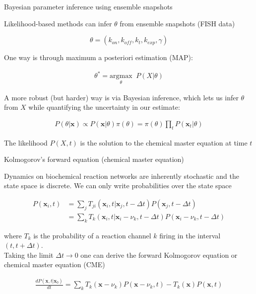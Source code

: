 \documentclass[aspectratio=1610]{beamer}					%
\begin{document}
\begin{frame}{Bayesian parameter inference using ensemble snapshots}
\vspace{0.1in}

Likelihood-based methods can infer $\theta$ from ensemble snapshots (FISH data)

\begin{equation*}
\theta = \left( k_{on},k_{off},k_{t},k_{exp},\gamma\right)
\end{equation*}

One way is through maximum a posteriori estimation (MAP):

\begin{align*}
\theta^{*} = \underset{\theta}{\mathrm{argmax}} \;\;P(X|\theta)
\end{align*}

A more robust (but harder) way is via Bayesian inference, which lets us infer $\theta$ from $X$ while quantifying the uncertainty in our estimate:

\begin{align*}
P(\theta|\mathbf{x}) \propto P(\mathbf{x}|\theta)\pi(\theta) = \pi(\theta)\prod_{t} P(\mathbf{x}_{t}|\theta)
\end{align*}

The likelihood $P(X,t)$ is the solution to the chemical master equation at time $t$

\end{frame}

\begin{frame}{Kolmogorov's forward equation (chemical master equation)}

Dynamics on biochemical reaction networks are inherently stochastic and the state space is discrete. We can only write probabilities over the state space

\vspace{0.1in}

\begin{align*}
P(\mathbf{x}_{i},t) &= \sum_{j} T_{ji}(\mathbf{x}_{i},t|\mathbf{x}_{j},t-\Delta t)P(\mathbf{x}_{j},t-\Delta t)\\ 
&= \sum_{k} T_{k}(\mathbf{x}_{i},t|\mathbf{x}_{i}-\nu_{k},t-\Delta t)P(\mathbf{x}_{i}-\nu_{k},t-\Delta t)
\end{align*}

where $T_{k}$ is the probability of a reaction channel $k$ firing in the interval $(t,t+\Delta t)$.\\
\vspace{0.1in}
Taking the limit $\Delta t \rightarrow 0$ one can derive the forward Kolmogorov equation or chemical master equation (CME)

\begin{align*}
\frac{dP(\mathbf{x},t|\mathbf{x}_{0})}{dt} = \sum_{k} T_{k}(\mathbf{x}-\nu_{k})P(\mathbf{x}-\nu_{k},t) - T_{k}(\mathbf{x})P(\mathbf{x},t)
\end{align*}

\end{frame}
\end{document}
